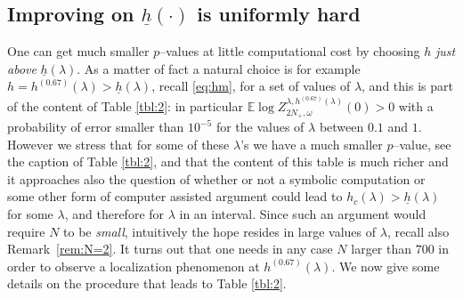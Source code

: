 \documentclass[reqno,11pt]{amsart}
\numberwithin{equation}{section}
\newcommand{\bbE}{{\ensuremath{\mathbb E}} }
\newcommand{\go}{\omega}
\newcommand{\gl}{\lambda}
\begin{document}
\subsection{Improving on $\underline{h}(\cdot)$ is uniformly hard}
\label{sec:computer_assisted}
One can get much smaller $p$--values at little computational cost  by choosing
$h$ {\sl just above} $\underline{h}(\gl)$. As a matter of fact
a natural choice is for example  $h=h ^{(0.67)}(\gl)>\underline{h}(\gl)$, recall
\eqref{eq:hm}, for a set of values of $\gl$, and this is part of the content of
Table \ref{tbl:2}: in particular $\bbE \log Z_{2N_+,\go}^{\gl,h^{(0.67)}(\gl)}(0)  >0$
with a probability of error smaller than $10^{-5}$ for the values of $\gl$
between $0.1$ and $1$. However we stress that
for some of these $\gl$'s we have a much smaller $p$--value, see the caption
of Table \ref{tbl:2}, and that the content of this table is much richer
and it approaches also the question of whether or not
a symbolic computation  or some other form of
computer assisted argument could lead to $h_c(\gl)>\underline{h}(\gl)$ for
some $\gl$, and therefore for $\gl$ in an interval. Since such an argument would require
$N$ to be {\sl small}, intuitively the hope resides in large values of $\gl$, recall also
  Remark~\ref{rem:N=2}. It turns out that one needs in any case
  $N$ larger than $700$ in order to observe a localization phenomenon
  at $h^{(0.67)}(\gl)$.
We now give some details on the procedure that leads to Table  \ref{tbl:2}.
\end{document}
